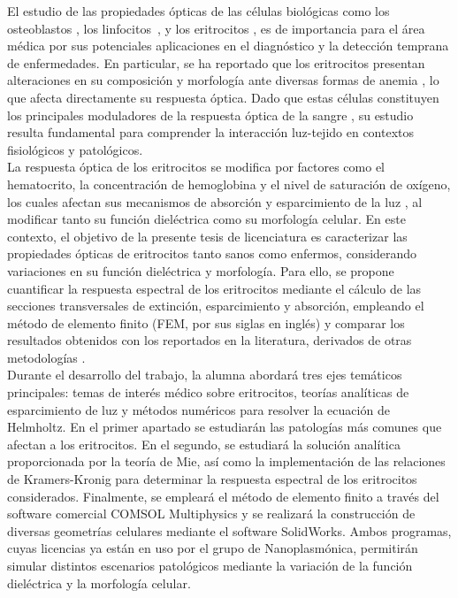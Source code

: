 \documentclass[11pt,letterpaper]{article}
\begin{document}
	El estudio de las propiedades ópticas de las células biológicas como los osteoblastos \cite{antunesOpticalPropertiesBone2019}, los linfocitos~\cite{yoonIdentificationNonactivatedLymphocytes2017}, y los eritrocitos \cite{bosschaartLiteratureReviewNovel2014}, es de importancia para el área médica por sus potenciales aplicaciones en el diagnóstico y la detección temprana de enfermedades.  En particular, se ha reportado que los eritrocitos presentan alteraciones en su composición y morfología ante diversas formas de anemia \cite{bosschaartLiteratureReviewNovel2014}, lo que afecta directamente su respuesta óptica. Dado que estas células constituyen los principales moduladores de la respuesta óptica de la sangre \cite{bosschaartLiteratureReviewNovel2014}, su estudio resulta fundamental para comprender la interacción luz-tejido en contextos fisiológicos y patológicos.\\
	
	La respuesta óptica de los eritrocitos se modifica por factores como el hematocrito, la concentración de hemoglobina y el nivel de saturación de oxígeno, los cuales afectan sus mecanismos de absorción y esparcimiento de la luz \cite{bosschaartLiteratureReviewNovel2014}, al modificar tanto su función dieléctrica como su morfología celular. En este contexto, el objetivo de la presente tesis de licenciatura es caracterizar las propiedades ópticas de eritrocitos tanto sanos como enfermos, considerando variaciones en su función dieléctrica y morfología. Para ello, se propone cuantificar la respuesta espectral de los eritrocitos mediante el cálculo de las secciones transversales de extinción, esparcimiento y absorción, empleando el método de elemento finito (FEM, por sus siglas en inglés) y comparar los resultados obtenidos con los reportados en la literatura, derivados de otras metodologías \cite{ergulComputationalStudyScattering2010,wriedtLightScatteringSingle2006}.\\
	
	Durante el desarrollo del trabajo, la alumna abordará tres ejes temáticos principales: temas de interés médico sobre eritrocitos,  teorías analíticas de esparcimiento de luz y métodos numéricos para resolver la ecuación de Helmholtz. En el primer apartado se estudiarán las patologías más comunes que afectan a los eritrocitos. En el segundo, se estudiará la solución analítica proporcionada por la teoría de Mie, así como la implementación de las relaciones de Kramers-Kronig \cite{lucariniKramersKronigRelationsOptical2005} para determinar la respuesta espectral de los eritrocitos considerados. Finalmente, se empleará el método de elemento finito a través del software comercial COMSOL Multiphysics y se realizará la construcción de diversas geometrías celulares mediante el software SolidWorks. Ambos programas, cuyas licencias ya están en uso por el grupo de Nanoplasmónica, permitirán simular distintos escenarios patológicos mediante la variación de la función dieléctrica y la morfología celular.\\
	
\end{document}
